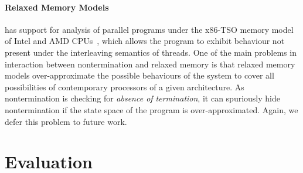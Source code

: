 \paragraph{Relaxed Memory Models}
%
\divine has support for analysis of parallel programs under the x86-TSO memory model of Intel and AMD CPUs~\cite{SB2018x86tso}, which allows the program to exhibit behaviour not present under the interleaving semantics of threads.
One of the main problems in interaction between nontermination and relaxed memory is that relaxed memory models over-approximate the possible behaviours of the system to cover all possibilities of contemporary processors of a given architecture.
As nontermination is checking for \emph{absence of termination}, it can spuriously hide nontermination if the state space of the program is over-approximated.
Again, we defer this problem to future work.

\section{Evaluation} \label{sec:evaluation}

